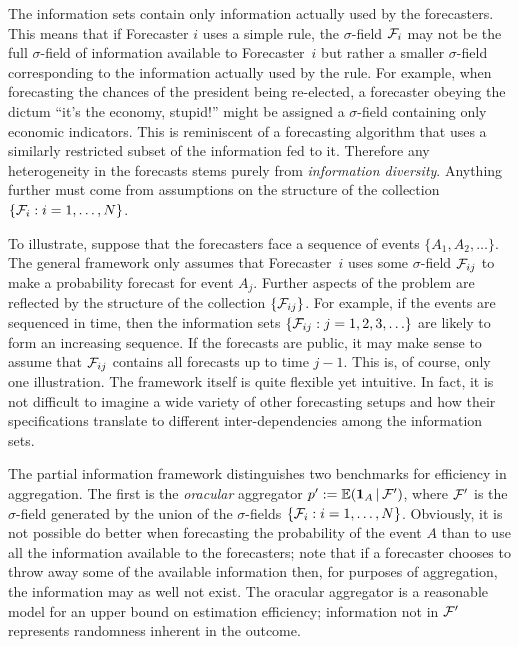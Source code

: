 \documentclass[11pt]{article}
\newcommand{\E}{\mathbb{E}}
\theoremstyle{definition}
\theoremstyle{definition}
\def\one{{\bf 1}}
\def\F{{\cal F}}
\def\E{{\mathbb E}}
\def\|{\, | \,}
\begin{document}
The information sets contain only information actually used by the forecasters. This means that if Forecaster $i$ uses a simple rule, the $\sigma$-field $\F_i$ may 
not be the full $\sigma$-field of information available to 
Forecaster~$i$ but rather a smaller $\sigma$-field corresponding
to the information actually used by the rule.  For example, 
when forecasting the chances of the president being re-elected,
a forecaster obeying the dictum ``it's the economy, stupid!''
might be assigned a $\sigma$-field containing only economic indicators. 
This is reminiscent of a forecasting algorithm that uses a similarly restricted subset
of the information fed to it. Therefore any heterogeneity in the forecasts stems purely  from \textit{information diversity}.  Anything further must come from
assumptions on the structure of the collection $\{ \F_i : i = 1, \dots, N\}$.

To illustrate, suppose that the forecasters face a sequence of
 events $\{ A_1, A_2 , \ldots \}$. The general  framework only assumes that Forecaster~$i$ uses some 
$\sigma$-field $\F_{ij}$ to make a probability forecast for event $A_j$.  Further aspects of the problem are
reflected by the structure of the collection $\{ \F_{ij} \}$.
For example, if the events are sequenced in time, then the information sets
$\{ \F_{ij} : j = 1 , 2, 3, \ldots \}$ are likely to form an increasing 
sequence.  If the forecasts are public, it may make sense to 
assume that $\F_{ij}$ contains all forecasts up to time $j-1$.
This is, of course, only one illustration. The framework itself is quite flexible yet intuitive. In fact, it is not difficult to imagine a wide variety of other forecasting setups and how their specifications translate to different inter-dependencies among the information sets.




The partial information framework distinguishes two benchmarks for efficiency in
aggregation.  The first is the {\em oracular} aggregator $p' := \E (\one_A \| \F')$, where $\F'$ is the $\sigma$-field
generated by the union of the $\sigma$-fields $\{ \F_i : i = 1, \dots, N\}$.  Obviously, it is not possible do better when forecasting the
probability of the event $A$ than to use all the information available 
to the forecasters; note that if a forecaster chooses to throw away 
some of the available information then, for purposes of aggregation,
the information may as well not exist.  The oracular aggregator
is a reasonable model for an upper bound on estimation efficiency;
information not in $\F'$ represents randomness inherent in the outcome. 
\end{document}
